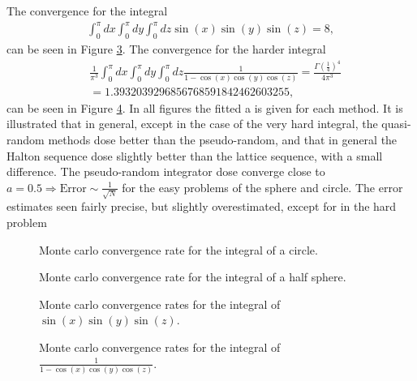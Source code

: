 \documentclass[onecolumn]{article}
\begin{document}
The convergence for the integral 
\begin{align}
    \int^{\pi}_{0} dx \int^{\pi}_{0} dy \int^{\pi}_{0} dz \sin(x)\sin(y)\sin(z) = 8,
\end{align}
can be seen in Figure \ref{fig:sin}. The convergence for the harder integral 
\begin{align}
    &\frac{1}{\pi^3}\int^{\pi}_{0} dx \int^{\pi}_{0} dy \int^{\pi}_{0} dz \frac{1}{1-\cos(x)\cos(y)\cos(z)}=  \frac{\Gamma\left(\frac{1}{4}\right)^4}{4\pi^3} \\&= 1.3932039296856768591842462603255,
\end{align}
can be seen in Figure \ref{fig:cos}. In all figures the fitted a is given for each method.
It is illustrated that in general, except in the case of the very hard integral, the quasi-random methods dose better 
than the pseudo-random, and that in general the Halton sequence dose slightly better than the lattice sequence, with a small difference. 
The pseudo-random integrator dose converge close to $a=0.5\Rightarrow\text{Error}\sim\frac{1}{\sqrt{N}}$ for the easy problems of the sphere and circle.
The error estimates seen fairly precise, but slightly overestimated, except for in the hard problem

\begin{figure}[h]
    \centering
    \makebox[\textwidth][c]{}
    \caption{Monte carlo convergence rate for the integral of a circle.}
    \label{fig:circle}
\end{figure}
\begin{figure}[h]
    \centering
    \makebox[\textwidth][c]{}
    \caption{Monte carlo convergence rate for the integral of a half sphere.}
    \label{fig:sphere}
\end{figure}
\begin{figure}[h]
    \centering
    \makebox[\textwidth][c]{}
    \caption{Monte carlo convergence rates for the integral of $\sin(x)\sin(y)\sin(z)$.}
    \label{fig:sin}
\end{figure}
\begin{figure}[h]
    \centering
    \makebox[\textwidth][c]{}
    \caption{Monte carlo convergence rates for the integral of $\frac{1}{1-\cos(x)\cos(y)\cos(z)}$.}
    \label{fig:cos}
\end{figure}
\end{document}
